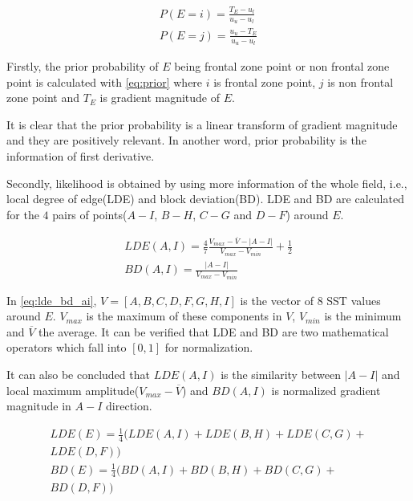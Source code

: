 \begin{equation}\label{eq:prior}
	\begin{gathered}
		P(E=i)=\frac{T_E-u_l}{u_u-u_l}\\
		P(E=j)=\frac{u_u-T_E}{u_u-u_l}
	\end{gathered}
\end{equation}

Firstly, the prior probability of $E$ being frontal zone point or non frontal zone point is calculated with \eqref{eq:prior} where $i$ is frontal zone point, $j$ is non frontal zone point and $T_E$ is gradient magnitude of $E$.

It is clear that the prior probability is a linear transform of gradient magnitude and they are positively relevant. In another word, prior probability is the information of first derivative.

Secondly, likelihood is obtained by using more information of the whole field, i.e., local degree of edge(LDE) and block deviation(BD)\cite{Ping-2014}. LDE and BD are calculated for the $4$ pairs of points($A-I$, $B-H$, $C-G$ and $D-F$) around $E$. 

\begin{equation}\label{eq:lde_bd_ai}
	\begin{gathered}
		LDE(A,I)=\frac{4}{7}\frac{V_{max}-\overline{V}-|A-I|}{V_{max}-V_{min}}+\frac{1}{2}\\
		BD(A,I)=\frac{|A-I|}{V_{max}-V_{min}}
	\end{gathered}
\end{equation}

In \eqref{eq:lde_bd_ai}, $V=[A, B, C, D, F, G, H, I]$ is the vector of $8$ SST values around $E$. $V_{max}$ is the maximum of these components in $V$, $V_{min}$ is the minimum and $\overline{V}$ the average. It can be verified that LDE and BD are two mathematical operators which fall into $[0, 1]$ for normalization\cite{Mansoori-2006, Bauer-1996}. 

It can also be concluded that $LDE(A,I)$ is the similarity between $|A-I|$ and local maximum amplitude($V_{max}-\overline{V}$) and $BD(A,I)$ is normalized gradient magnitude in $A-I$ direction.

\begin{equation}\label{eq:lde_bd_e}
	\begin{gathered}
		LDE(E)=\frac{1}{4}(LDE(A,I)+LDE(B,H)+LDE(C,G)+\\
		LDE(D,F))\\
		BD(E)=\frac{1}{4}(BD(A,I)+BD(B,H)+BD(C,G)+\\
		BD(D,F))\\
	\end{gathered}
\end{equation}


